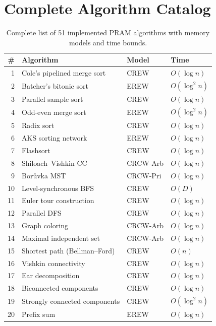 \documentclass[11pt]{article}
\begin{document}
\section{Complete Algorithm Catalog}
\label{app:catalog}

\begin{table}[p]
\centering
\caption{Complete list of 51 implemented PRAM algorithms with memory models
  and time bounds.}
\label{tab:fullcatalog}
\scriptsize
\begin{tabular}{@{}rlll@{}}
\toprule
\textbf{\#} & \textbf{Algorithm} & \textbf{Model} & \textbf{Time} \\
\midrule
1 & Cole's pipelined merge sort & CREW & $O(\log n)$ \\
2 & Batcher's bitonic sort & EREW & $O(\log^2 n)$ \\
3 & Parallel sample sort & CREW & $O(\log n)$ \\
4 & Odd-even merge sort & EREW & $O(\log^2 n)$ \\
5 & Radix sort & CREW & $O(\log n)$ \\
6 & AKS sorting network & EREW & $O(\log n)$ \\
7 & Flashsort & CREW & $O(\log n)$ \\
\midrule
8 & Shiloach--Vishkin CC & CRCW-Arb & $O(\log n)$ \\
9 & Bor\r{u}vka MST & CRCW-Pri & $O(\log n)$ \\
10 & Level-synchronous BFS & CREW & $O(D)$ \\
11 & Euler tour construction & CREW & $O(\log n)$ \\
12 & Parallel DFS & CREW & $O(\log n)$ \\
13 & Graph coloring & CRCW-Arb & $O(\log n)$ \\
14 & Maximal independent set & CRCW-Arb & $O(\log n)$ \\
15 & Shortest path (Bellman--Ford) & CREW & $O(n)$ \\
\midrule
16 & Vishkin connectivity & CREW & $O(\log n)$ \\
17 & Ear decomposition & CREW & $O(\log n)$ \\
18 & Biconnected components & CREW & $O(\log n)$ \\
19 & Strongly connected components & CREW & $O(\log^2 n)$ \\
\midrule
20 & Prefix sum & EREW & $O(\log n)$ \\

\end{tabular}
\end{table}
\end{document}
